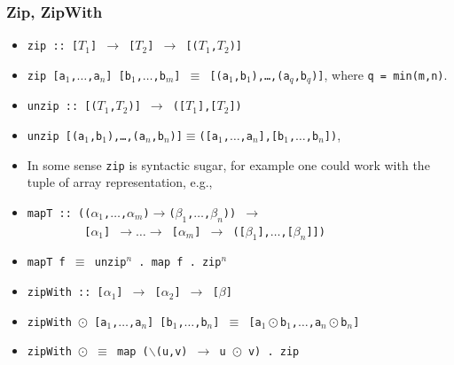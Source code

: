 \documentclass{beamer}
\renewcommand{\emph}[1]{\textcolor{structure}{#1}}
\newcommand{\emp}[1]{\textcolor{DikuRed}{ #1}}
\begin{document}
\begin{frame}[fragile,t]
  \frametitle{Zip, ZipWith}

\begin{itemize}
    \item \emph{\tt zip :: [$T_1$] $\rightarrow$ [$T_2$] $\rightarrow$ [($T_1$,$T_2$)]}
    \item \emp{\tt zip [a$_1$,$\ldots$,a$_n$] [b$_1$,$\ldots$,b$_m$] $\equiv$ [(a$_1$,b$_1$),\ldots,(a$_q$,b$_q$)]},
            where {\tt q = min(m,n)}.
    \item \emph{\tt unzip :: [($T_1$,$T_2$)] $\rightarrow$ ([$T_1$],[$T_2$])}
    \item \emp{\tt unzip [(a$_1$,b$_1$),\ldots,(a$_n$,b$_n$)]$\equiv$([a$_1$,$\ldots$,a$_n$],[b$_1$,$\ldots$,b$_n$])},\medskip

    \item In some sense {\tt zip} is syntactic sugar, for example one could work with the
            tuple of array representation, e.g.,
    \item \emp{\tt mapT :: (($\alpha_1$,$\ldots$,$\alpha_m$)$\rightarrow$($\beta_1$,$\ldots$,$\beta_n$)) $\rightarrow$}\\ 
          \emp{\tt~~~~~~~~~[$\alpha_1$] $\rightarrow\ldots\rightarrow$ [$\alpha_m$] $\rightarrow$ ([$\beta_1$],$\ldots$,[$\beta_n$]])}
    \item \emph{\tt mapT f $\equiv$ unzip$^n$ . map f . zip$^n$}\medskip

    \item {\tt zipWith :: [$\alpha_1$] $\rightarrow$ [$\alpha_2$] $\rightarrow$ [$\beta$]}
    \item {\tt zipWith $\odot$ [a$_1$,$\ldots$,a$_n$] [b$_1$,$\ldots$,b$_n$] $\equiv$ [a$_1\odot$b$_1$,$\ldots$,a$_n\odot$b$_n$]}
    \item {\tt zipWith $\odot$ $\equiv$ map ($\backslash$(u,v) $\rightarrow$ u $\odot$ v) . zip}
\end  {itemize}

\end{frame}
\end{document}
